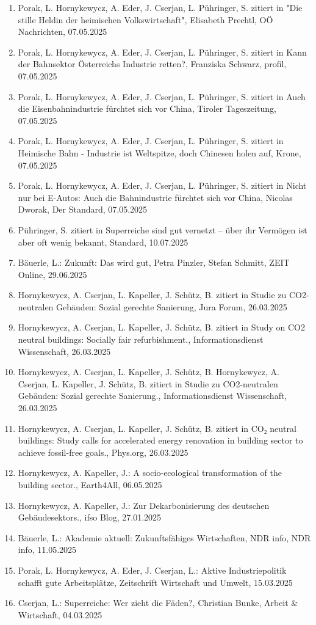 \begin{enumerate}
	 \item Porak, L. Hornykewycz, A. Eder, J. Cserjan, L. Pühringer, S. zitiert in "Die stille Heldin der heimischen Volkswirtschaft", Elisabeth Prechtl, OÖ Nachrichten, 07.05.2025
	 \item Porak, L. Hornykewycz, A. Eder, J. Cserjan, L. Pühringer, S. zitiert in Kann der Bahnsektor Österreichs Industrie retten?, Franziska Schwarz, profil, 07.05.2025
	 \item Porak, L. Hornykewycz, A. Eder, J. Cserjan, L. Pühringer, S. zitiert in Auch die Eisenbahnindustrie fürchtet sich vor China, Tiroler Tageszeitung, 07.05.2025
	 \item Porak, L. Hornykewycz, A. Eder, J. Cserjan, L. Pühringer, S. zitiert in Heimische Bahn - Industrie ist Weltspitze, doch Chinesen holen auf, Krone, 07.05.2025
	 \item Porak, L. Hornykewycz, A. Eder, J. Cserjan, L. Pühringer, S. zitiert in Nicht nur bei E-Autos: Auch die Bahnindustrie fürchtet sich vor China, Nicolas Dworak, Der Standard, 07.05.2025
	 \item Pühringer, S. zitiert in Superreiche sind gut vernetzt – über ihr Vermögen ist aber oft wenig bekannt, Standard, 10.07.2025
	 \item Bäuerle, L.: Zukunft: Das wird gut, Petra Pinzler, Stefan Schmitt, ZEIT Online, 29.06.2025
	 \item Hornykewycz, A. Cserjan, L. Kapeller, J. Schütz, B. zitiert in Studie zu CO2-neutralen Gebäuden: Sozial gerechte Sanierung, Jura Forum, 26.03.2025
	 \item Hornykewycz, A. Cserjan, L. Kapeller, J. Schütz, B. zitiert in Study on CO2 neutral buildings: Socially fair refurbishment., Informationsdienst Wissenschaft, 26.03.2025
	 \item Hornykewycz, A. Cserjan, L. Kapeller, J. Schütz, B.  Hornykewycz, A. Cserjan, L. Kapeller, J. Schütz, B. zitiert in Studie zu CO2-neutralen Gebäuden: Sozial gerechte Sanierung., Informationsdienst Wissenschaft, 26.03.2025
	 \item Hornykewycz, A. Cserjan, L. Kapeller, J. Schütz, B. zitiert in CO₂ neutral buildings: Study calls for accelerated energy renovation in building sector to achieve fossil-free goals., Phys.org, 26.03.2025
	 \item Hornykewycz, A. Kapeller, J.: A socio-ecological transformation of the building sector., Earth4All, 06.05.2025
	 \item Hornykewycz, A. Kapeller, J.: Zur Dekarbonisierung des deutschen Gebäudesektors., ifso Blog, 27.01.2025
	 \item Bäuerle, L.: Akademie aktuell: Zukunftsfähiges Wirtschaften, NDR info, NDR info, 11.05.2025
	 \item Porak, L. Hornykewycz, A. Eder, J. Cserjan, L.: Aktive Industriepolitik schafft gute Arbeitsplätze, Zeitschrift Wirtschaft und Umwelt, 15.03.2025
	 \item Cserjan, L.: Superreiche: Wer zieht die Fäden?, Christian Bunke, Arbeit & Wirtschaft, 04.03.2025
\end{enumerate}
